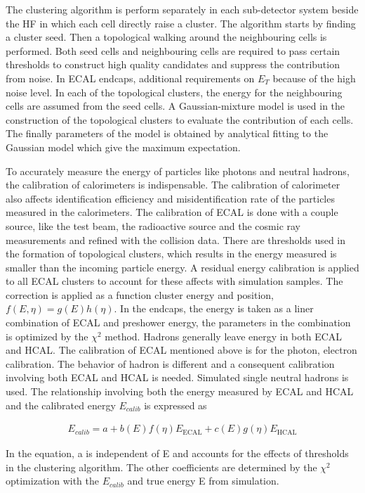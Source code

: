 The clustering algorithm is perform separately in each sub-detector system beside the HF in which each cell directly raise a cluster. The algorithm starts by finding a cluster seed. Then a topological walking around the neighbouring cells is performed. Both seed cells and neighbouring cells are required to pass certain thresholds to construct high quality candidates and suppress the contribution from noise. In ECAL endcaps, additional requirements on $E_{T}$ because of the high noise level. In each of the topological clusters, the energy for the neighbouring cells are assumed from the seed cells. A Gaussian-mixture model is used in the construction of the topological clusters to evaluate the contribution of each cells. The finally parameters of the model is obtained by analytical fitting to the Gaussian model which give the maximum expectation.

To accurately measure the energy of particles like photons and neutral hadrons, the calibration of calorimeters is indispensable. The calibration of calorimeter also affects identification efficiency and misidentification rate of the particles measured in the calorimeters. The calibration of ECAL is done with a couple source, like the test beam, the radioactive source and the cosmic ray measurements and refined with the collision data. There are thresholds used in the formation of topological clusters, which results in the energy measured is smaller than the incoming particle energy. A residual energy calibration is applied to all ECAL clusters to account for these affects with simulation samples.  The correction is applied as a function cluster energy and position, $f(E,\eta)=g(E)h(\eta)$. In the endcaps, the energy is taken as a liner combination of ECAL and preshower energy, the parameters in the combination is optimized by the $\chi^{2}$ method. Hadrons generally leave energy in both ECAL and HCAL. The calibration of ECAL mentioned above is for the photon, electron calibration. The behavior of hadron is different and a consequent calibration involving both ECAL and HCAL is needed. Simulated single neutral hadrons is used. The relationship involving both the energy measured by ECAL and HCAL and the calibrated energy $E_{calib}$ is expressed as

\begin{align*}
E_{calib}=a+b(E)f(\eta)E_{\textrm{ECAL}}+c(E)g(\eta)E_{\textrm{HCAL}}
\end{align*}

In the equation, a is independent of E and accounts for the effects of thresholds in the clustering algorithm. The other coefficients are determined by the $\chi^{2}$ optimization with the $E_{calib}$ and true energy E from simulation. 




